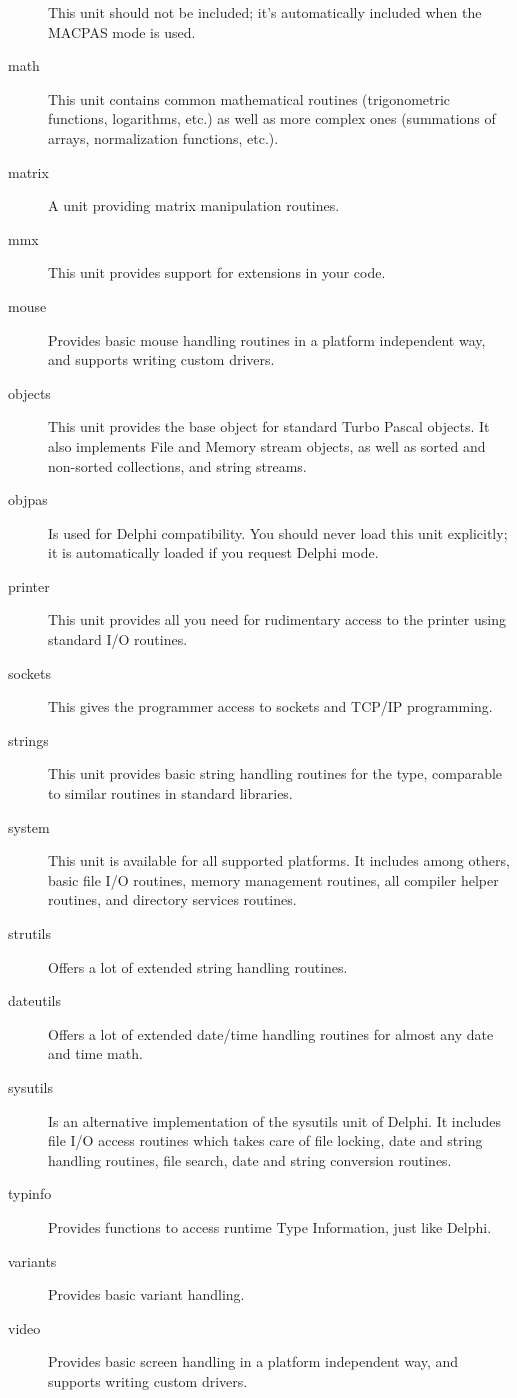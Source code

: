 \begin{description}
This unit should not be included; it's automatically included when the MACPAS mode is used.
\item[math] This unit contains common mathematical routines (trigonometric
functions, logarithms, etc.) as well as more complex ones (summations of arrays,
normalization functions, etc.).
\item[matrix] A unit providing matrix manipulation routines.
\item[mmx] This unit provides support for  extensions in your
code. 
\item[mouse] Provides basic mouse handling routines in a platform independent way,
and supports writing custom drivers. 
\item [objects]  This unit provides the base object for standard Turbo Pascal
objects. It also implements File and Memory stream objects, as well as sorted
and non-sorted collections, and string streams.
\item[objpas] Is used for Delphi compatibility. You should never load this
unit explicitly; it is automatically loaded if you request Delphi mode.
\item[printer]  This unit provides all you need for rudimentary access
to the printer using standard I/O routines.
\item[sockets] This gives the programmer access to sockets and TCP/IP 
programming.
\item[strings] This unit provides basic string handling routines for the
 type, comparable to similar routines in standard 
libraries.
\item[system] This unit is available for all supported platforms. It includes
among others, basic file I/O routines, memory management routines, all compiler 
helper routines, and directory services routines. 
\item[strutils] Offers a lot of extended string handling routines. 
\item[dateutils] Offers a lot of extended date/time handling routines for 
almost any date and time math. 
\item[sysutils] Is an alternative implementation of the sysutils unit of
Delphi. It includes file I/O access routines which takes care of file
locking, date and string handling routines, file search, date and string 
conversion routines.
\item[typinfo] Provides functions to access runtime Type Information, just
like Delphi.
\item[variants] Provides basic variant handling.
\item[video] Provides basic screen handling in a platform independent way,
and supports writing custom drivers.
\end{description}

